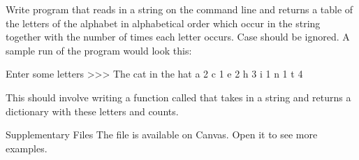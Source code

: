 \documentclass[11pt]{cselabheader}
\begin{document}
\begin{ex}[lettercount.py]
Write program that reads in a string on the command line and returns a table of
the letters of the alphabet in alphabetical order which occur in the string
together with the number of times each letter occurs. Case should be ignored. A
sample run of the program would look this:

\begin{verbatimcode}
Enter some letters >>> The cat in the hat
a 2
c 1
e 2
h 3
i 1
n 1
t 4
\end{verbatimcode}

This should involve writing a function called  that
takes in a string and returns a dictionary with these letters and counts.
\end{ex}

\begin{infobox}{Supplementary Files}
The file  is available on Canvas.
Open it to see more examples.
\end{infobox}
\end{document}
